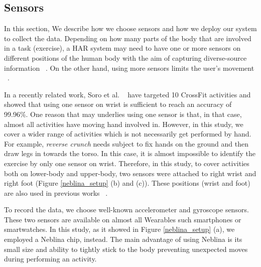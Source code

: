 \documentclass[journal,article,submit,moreauthors,pdftex]{Definitions/mdpi}
\begin{document}
\subsection{Sensors} 

In this section, We describe how we choose sensors and how we deploy our system to collect the data. Depending on how many parts of the body that are involved in a task (exercise), a HAR system may need to have one or more sensors on different positions of the human body with the aim of capturing diverse-source information ~\cite{wang2019survey}. On the other hand, using more sensors limits the user's movement ~\cite{de2018comparative}. 

In a recently related work, Soro et al. ~\cite{soro2019recognition} have targeted 10 CrossFit activities and showed that using one sensor on wrist is sufficient to reach an accuracy of 99.96\%. One reason that may underlies using one sensor is that, in that case, almost all activities have moving hand involved in. However, in this study, we cover a wider range of activities which is not necessarily get performed by hand. For example, \textit{reverse crunch} needs subject to fix hands on the ground and then draw legs in towards the torso. In this case, it is almost impossible to identify the exercise by only one sensor on wrist. Therefore, in this study, to cover activities both on lower-body and upper-body, two sensors were attached to right wrist and right foot (Figure \ref{neblina_setup} (b) and (c)). These positions (wrist and foot) are also used in previous works ~\cite{baldominos2019comparison, anwary2018automatic, soro2019recognition}.

To record the data, we choose well-known accelerometer and gyroscope sensors. These two sensors are  available on almost all Wearables such smartphones or smartwatches. In this study, as it showed in Figure \ref{neblina_setup} (a), we employed a Neblina chip, instead. The main advantage of using Neblina is its small size and ability to tightly stick to the body preventing unexpected moves during performing an activity.
\end{document}
